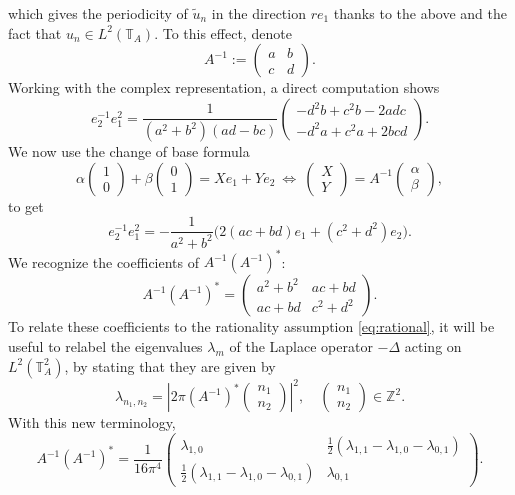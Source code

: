 \documentclass[a4paper,11pt]{amsart}
\numberwithin{equation}{section}
\theoremstyle{definition}
\newcommand{\twotorus}{\mathbb T^2_A}
\begin{document}
which gives the periodicity of $\widetilde u_n$ in the direction $re_1$ thanks to the above and the fact that $u_n \in L^2(\mathbb T_A)$.
To this effect, denote
$$
A^{-1} := 
\begin{pmatrix}
a & b \\ c & d
\end{pmatrix}.
$$
Working with the complex representation, a direct computation shows
$$
e_2 ^{-1} e_1^2 = \frac{1}{(a^2 + b^2)(ad-bc)} \begin{pmatrix}
-d^2b + c^2b -2adc\\ -d^2a+c^2a +2bcd
\end{pmatrix}.
$$
We now use the change of base formula 
\[
    \alpha \begin{pmatrix}
        1 \\
        0
    \end{pmatrix} + \beta \begin{pmatrix}
        0 \\
        1
    \end{pmatrix} = Xe_1 + Ye_2\ \Longleftrightarrow\ \begin{pmatrix}
        X \\
        Y
    \end{pmatrix} = A^{-1}\begin{pmatrix}
        \alpha \\
        \beta
    \end{pmatrix},
\]
to get
$$
e_2 ^{-1} e_1^2 = - \frac{1}{a^2+b^2}\big( 2(ac + bd)e_1 + (c^2+d^2)e_2 \big).
$$
We recognize the coefficients of $A^{-1}(A^{-1})^*$:
$$
A^{-1}(A^{-1})^* = 
\begin{pmatrix}
a^2 + b^2 & ac+bd\\  ac+bd & c^2 + d^2
\end{pmatrix}.
$$
To relate these coefficients to the rationality assumption \eqref{eq:rational},
it will be useful to relabel the eigenvalues $\lambda_m$ of the Laplace operator $-\Delta$ acting on $L^2(\twotorus)$, by stating that they are given by
\[
	\lambda_{n_1,n_2} = \left\vert 2\pi(A^{-1})^*\begin{pmatrix}
        n_1 \\
        n_2
    \end{pmatrix}\right\vert^2,\quad \begin{pmatrix}
        n_1 \\
        n_2
    \end{pmatrix}\in\mathbb Z^2.
\] 
With this new terminology,
\begin{equation} \label{eq:quad_form}
A^{-1}(A^{-1})^* = \frac1{16\pi^4}
\begin{pmatrix}
\lambda_{1,0} & \frac 12 (\lambda_{1,1} - \lambda_{1,0}-\lambda_{0,1})\\ \frac 12 (\lambda_{1,1} - \lambda_{1,0}-\lambda_{0,1}) & \lambda_{0,1}
\end{pmatrix}.
\end{equation}
\end{document}
